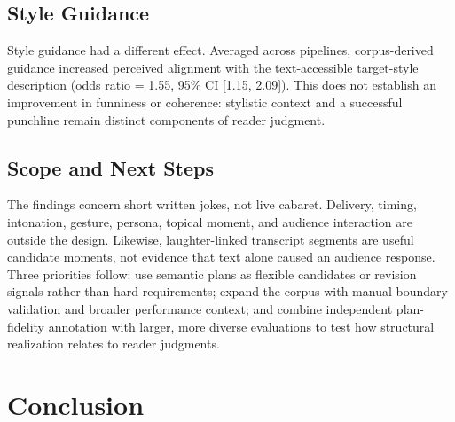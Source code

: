 \documentclass[11pt]{article}
\begin{document}
\subsection{Style Guidance}\label{style-guidance}

Style guidance had a different effect. Averaged across pipelines, corpus-derived guidance increased perceived alignment with the text-accessible target-style description (odds ratio = 1.55, 95\% CI {[}1.15, 2.09{]}). This does not establish an improvement in funniness or coherence: stylistic context and a successful punchline remain distinct components of reader judgment.

\subsection{Scope and Next Steps}\label{scope-and-next-steps}

The findings concern short written jokes, not live cabaret. Delivery, timing, intonation, gesture, persona, topical moment, and audience interaction are outside the design. Likewise, laughter-linked transcript segments are useful candidate moments, not evidence that text alone caused an audience response. Three priorities follow: use semantic plans as flexible candidates or revision signals rather than hard requirements; expand the corpus with manual boundary validation and broader performance context; and combine independent plan-fidelity annotation with larger, more diverse evaluations to test how structural realization relates to reader judgments.

\section{Conclusion}\label{conclusion}
\end{document}
